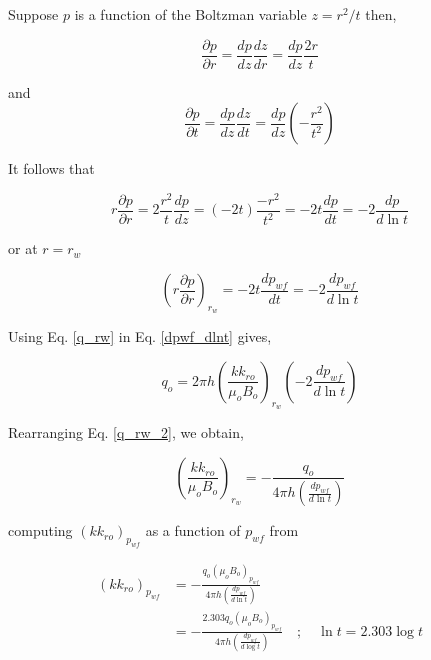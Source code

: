\documentclass{llncs}
\numberwithin{equation}{section}
\numberwithin{figure}{section}
\numberwithin{table}{section}
\begin{document}
    Suppose $p$ is a function of the Boltzman variable $z=r^{2}/t$ then,
    
    \begin{equation}
        \frac{\partial p}{\partial r}=\frac{dp}{dz}\frac{dz}{dr}=\frac{dp}{dz}\frac{2r}{t}
        \label{chain_dpdr_z}
    \end{equation} 
    
    and
    \begin{equation}
        \frac{\partial p}{\partial t}=\frac{dp}{dz}\frac{dz}{dt}=\frac{dp}{dz}\left( -\frac{{{r}^{2}}}{{{t}^{2}}} \right)
        \label{chain_dpdt_z}
    \end{equation}
    
    It follows that
    
    \begin{equation*}    
    r\frac{\partial p}{\partial r}=2\frac{{{r}^{2}}}{t}\frac{dp}{dz}=\left( -2t \right)\frac{-{{r}^{2}}}{{{t}^{2}}}=-2t\frac{dp}{dt}=-2\frac{dp}{d\ln t}
    \end{equation*}    
    
    or at $r=r_{w}$
    
    \begin{equation}    
    {{\left( r\frac{\partial p}{\partial r} \right)}_{{{r}_{w}}}}=-2t\frac{d{{p}_{wf}}}{dt}=-2\frac{d{{p}_{wf}}}{d\ln t}
        \label{dpwf_dlnt}      
    \end{equation}    
    
    Using Eq. \ref{q_rw} in Eq. \ref{dpwf_dlnt} gives,
    
    \begin{equation}      
    {{q}_{o}}=2\pi h{{\left( \frac{k{{k}_{ro}}}{{{\mu }_{o}}{{B}_{o}}} \right)}_{{{r}_{w}}}}\left( -2\frac{d{{p}_{wf}}}{d\ln t} \right)
        \label{q_rw_2}
    \end{equation}    
    
    Rearranging Eq. \ref{q_rw_2}, we obtain,
    
    \begin{equation}
    {{\left( \frac{k{{k}_{ro}}}{{{\mu }_{o}}{{B}_{o}}} \right)}_{{{r}_{w}}}}=-\frac{{{q}_{o}}}{4\pi h\left( \frac{d{{p}_{wf}}}{d\ln t} \right)}
        \label{q_rw_3}
    \end{equation}      
    
    computing ${{\left( k{{k}_{ro}} \right)}_{{{p}_{wf}}}}$ as a function of $p_{wf}$ from
    
    \begin{equation}
        \begin{split}
     {{\left( k{{k}_{ro}} \right)}_{{{p}_{wf}}}}&=-\frac{{{q}_{o}}{{\left( {{\mu }_{o}}{{B}_{o}} \right)}_{{{p}_{wf}}}}}{4\pi h\left( \frac{d{{p}_{wf}}}{d\ln t} \right)} \\
    & =-\frac{2.303{{q}_{o}}{{\left( {{\mu }_{o}}{{B}_{o}} \right)}_{{{p}_{wf}}}}}{4\pi h\left( \frac{d{{p}_{wf}}}{d\log t} \right)}\quad ;\quad \ln t=2.303\log t \\
    \end{split}
        \label{kkro_compute}
    \end{equation}     
    
\end{document}
